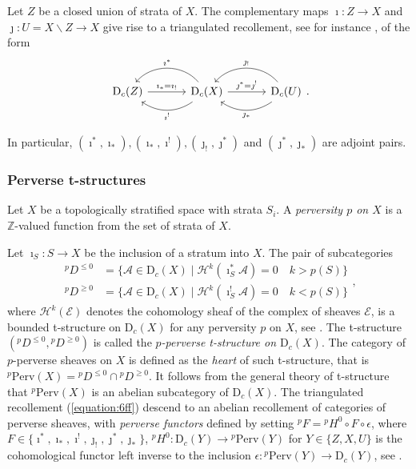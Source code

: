 \documentclass[11pt]{amsart}
\theoremstyle{definition}
\newcommand{\Z}{\mathbb{Z}}
\newcommand{\cat}[1]{\mathrm{#1}}
\newcommand{\perv}[2]{{}^{#1}\cat{Perv}\!\left(#2\right)}
\newcommand{\constr}[2]{\cat{D}_{#1}({#2})}
\newcommand{\sh}[1]{\mathcal{#1}}
\begin{document}
Let $Z$ be a closed union of strata of $X$. The complementary maps  $\imath\colon Z\to X$ and $\jmath\colon U=X\smallsetminus Z\to X$ give rise to a triangulated recollement, see for instance \cite[\S1.4.1]{BBD}, of the form
\begin{equation}\begin{tikzcd} [row sep={0.6cm},column sep={0.6cm}]\label{equation:6ff}
\constr{c}{Z}\ar[rr,"\imath_*=\imath_!"]&&\constr{c}{X}\ar[ll,"\imath^!",bend left=35]\ar[ll,"\imath^*", swap,bend right=50]\ar[rr,"\jmath^*=\jmath^!"]&&\constr{c}{U}\ar[ll,"\jmath_*",bend left=35]\ar[ll,"\jmath_!", swap,bend right=50]\end{tikzcd}.\end{equation}

In particular, $(\imath^*,\imath_*), (\imath_*,\imath^!), (\jmath_!,\jmath^*)$ and $(\jmath^*,\jmath_*)$ are adjoint pairs.

\subsubsection{Perverse t-structures}

Let $X$ be a topologically stratified space with strata $S_i$. A \emph{perversity $p$ on $X$} is a $\Z$-valued function from the set of strata of $X$.

Let $\imath_S\colon S\to X$ be the inclusion of a stratum into $X$. The pair of subcategories
\begin{equation}\label{perv_t_str}
\begin{split}
    {^p{D^{\leq0}}}&=\{\sh{A}\in\constr{c}{X}\mid \sh{H}^k(\imath_S^*\sh{A})=0 \quad k>p(S)\} \\
    {^p{D^{\geq0}}}&=\{\sh{A}\in\constr{c}{X}\mid \sh{H}^k(\imath_S^!\sh{A})=0 \quad k<p(S)\}
\end{split},
\end{equation}
where $\sh{H}^k(\sh{E})$ denotes the cohomology sheaf of the complex of sheaves $\sh{E}$, is a bounded t-structure on $\constr{c}{X}$ for any perversity $p$ on $X$, see \cite[2.1.4]{BBD}. The t-structure $({^p{D^{\leq0}}}, {^p{D^{\geq0}}})$ is called the \emph{$p$-perverse t-structure on $\constr{c}{X}$}. The category of $p$-perverse sheaves on $X$ is defined as the {\em heart} of such t-structure, that is $\perv{p}{X}={^p{D^{\leq0}}}\cap{^p{D^{\geq0}}}$. It follows from the general theory of t-structure that $\perv{p}{X}$ is an abelian subcategory of $\constr{c}{X}$. The triangulated recollement (\ref{equation:6ff}) descend to an abelian recollement of categories of perverse sheaves, with \emph{perverse functors} defined by setting $^pF={^pH^0}\circ F \circ \epsilon$, where $F\in\{\imath^*,\imath_*,\imath^!,\jmath_!,\jmath^*,\jmath_* \}$, $^pH^0\colon\constr{c}{Y}\to\perv{p}{Y}$ for $Y\in\{Z,X,U\}$ is the cohomological functor left inverse to the inclusion $\epsilon\colon\perv{p}{Y}\to\constr{c}{Y}$, see \cite[\S1.3.6]{BBD}.
\end{document}
